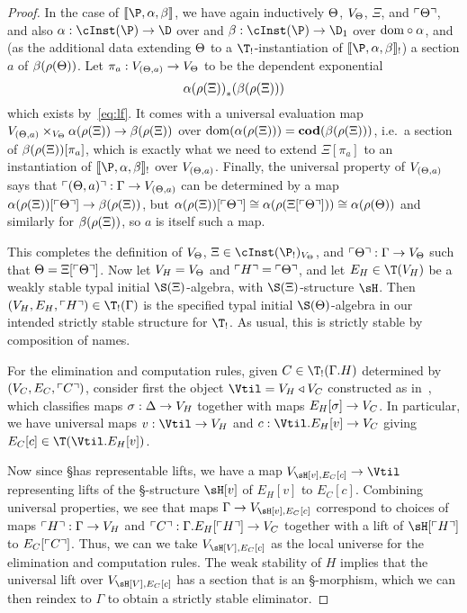 \begin{enumerate}
\begin{enumerate}
\begin{proof}
  In the case of $\termps{\P}{\al}{\be}$, we have again inductively $\Theta$, $V_\Theta$, $\Xi$, and $\ulcorner \Theta\urcorner$, and also $\al:\cInst(\P)\to\D$ over \C and $\be:\cInst(\P)\to\D_1$ over $\mathrm{dom}\circ \alpha$, and (as the additional data extending $\Theta$ to a $\T_!$-instantiation of $\termps{\P}{\al}{\be}_!$) a section $a$ of $\beta(\rho(\Theta))$.
  Let $\pi_a : V_{(\Theta,a)} \to V_\Theta$ to be the dependent exponential
  \[ {\alpha(\rho(\Xi))}_*(\beta(\rho(\Xi))) \]
  which exists by~\eqref{eq:lf}.
  It comes with a universal evaluation map $V_{(\Theta,a)} \times_{V_\Theta} \alpha(\rho(\Xi)) \to \beta(\rho(\Xi))$ over $\mathrm{dom}(\alpha(\rho(\Xi))) = \mathbf{cod}(\beta(\rho(\Xi)))$, i.e.\ a section of $\beta(\rho(\Xi))[\pi_a]$, which is exactly what we need to extend $\Xi[\pi_a]$ to an instantiation of $\termps{\P}{\al}{\be}_!$ over $V_{(\Theta,a)}$.
  Finally, the universal property of $V_{(\Theta,a)}$ says that $\ulcorner (\Theta,a)\urcorner : \Gamma \to V_{(\Theta,a)}$ can be determined by a map $\alpha(\rho(\Xi))[\ulcorner \Theta\urcorner] \to \beta(\rho(\Xi))$, but $\alpha(\rho(\Xi))[\ulcorner \Theta\urcorner] \cong \alpha(\rho(\Xi[\ulcorner \Theta\urcorner])) \cong \alpha(\rho(\Theta))$ and similarly for $\beta(\rho(\Xi))$, so $a$ is itself such a map.
  
  This completes the definition of $V_\Theta$, $\Xi\in\cInst(\P_!)_{V_\Th}$, and $\ulcorner \Theta\urcorner : \Gamma\to V_\Theta$ such that $\Theta = \Xi[\ulcorner \Theta\urcorner]$.
  Now let $V_H = V_\Theta$ and $\ulcorner H\urcorner = \ulcorner \Theta\urcorner$, and let $E_H\in\T(V_H)$ be a weakly stable typal initial $\S(\Xi)$-algebra, with $\S(\Xi)$-structure $\sH$.
  Then $(V_H,E_H,\name{H})\in\T_!(\Gamma)$ is the specified typal initial $\S(\Th)$-algebra in our intended strictly stable structure for $\T_!$.
  As usual, this is strictly stable by composition of names.

  For the elimination and computation rules, given $C\in \T_!(\Gamma.H)$ determined by $(V_C,E_C,\ulcorner C\urcorner)$, consider first the object $\Vtil = V_H\triangleleft V_C$ constructed as in~\cite{lw:localuniv}, which classifies maps $\sigma : \Delta \to V_H$ together with maps $E_H[\sigma] \to V_C$.
  In particular, we have universal maps $v:\Vtil\to V_H$ and $c:\Vtil.E_H[v]\to V_C$ giving $E_C[c]\in \T(\Vtil.E_H[v])$.

  Now since \S has representable lifts, we have a map $V_{\sH[v],E_C[c]} \to \Vtil$ representing lifts of the \S-structure $\sH[v]$ of $E_H[v]$ to $E_C[c]$.
  Combining universal properties, we see that maps $\Gamma\to V_{\sH[v],E_C[c]}$ correspond to choices of maps $\ulcorner H\urcorner:\Gamma\to V_H$ and $\ulcorner C\urcorner:\Gamma.E_H[\ulcorner H\urcorner]\to V_C$ together with a lift of $\sH[\name{H}]$ to $E_C[\ulcorner C\urcorner]$.
  Thus, we can we take $V_{\sH[V],E_C[c]}$ as the local universe for the elimination and computation rules.
  The weak stability of $H$ implies that the universal lift over $V_{\sH[V],E_C[c]}$ has a section that is an \S-morphism, which we can then reindex to $\Gamma$ to obtain a strictly stable eliminator.
\end{proof}


\end{enumerate}
\end{enumerate}
